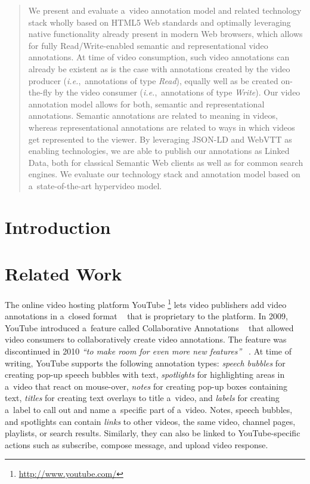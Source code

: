 \documentclass{sig-alternate}
\newcommand{\inlinelistingsize}{\fontsize{8pt}{11pt}}
\let\oldurl\url
\renewcommand{\url}[1]{\inlinelistingsize\oldurl{#1}}
\newcommand{\todo}[1]{\fcolorbox{blue}{white}{\parbox{7cm}{\color{blue}{#1}}}}
\begin{document}
\maketitle
\begin{abstract}
We present and evaluate
a~video annotation model and related technology stack
wholly based on HTML5 Web standards
and optimally leveraging native functionality
already present in modern Web browsers,
which allows for fully Read/Write-enabled
semantic and representational video annotations.
At time of video consumption, such video annotations
can already be existent as is the case
with annotations created by the video producer
(\emph{i.e.},~annotations of type \emph{Read}),
equally well as be created on-the-fly by the video consumer
(\emph{i.e.},~annotations of type \emph{Write}).
Our video annotation model allows for both,
semantic and representational annotations.
Semantic annotations are related to meaning in videos,
whereas representational annotations are related to
ways in which videos get represented to the viewer.
By leveraging JSON-LD and WebVTT as enabling technologies,
we are able to publish our annotations as Linked Data,
both for classical Semantic Web clients
as well as for common search engines.
We evaluate our technology stack and annotation model
based on a~state-of-the-art hypervideo model.
\end{abstract}

\category{ToDo}{\todo{category}}{}

\terms{\todo{terms}}

\keywords{\todo{keywords}}

\section{Introduction}

\section{Related Work}

The online video hosting platform YouTube%
\footnote{\url{http://www.youtube.com/}}
lets video publishers add video annotations
in a~closed format%
~\cite{youtube2008annotations,youtube2010annotations}
that is proprietary to the platform.
In 2009, YouTube introduced a~feature called 
Collaborative Annotations%
~\cite{fink2009collaborativeannotations}
that allowed video consumers to collaboratively
create video annotations.
The feature was discontinued in 2010
\textit{``to make room for even more new features''}%
~\cite{youtube2010annotations}.
At time of writing, YouTube supports the following
annotation types: \emph{speech bubbles} for creating
pop-up speech bubbles with text,
\emph{spotlights} for highlighting areas in a~video
that react on mouse-over,
\emph{notes} for creating pop-up boxes containing text,
\emph{titles} for creating text overlays to title a~video,
and \emph{labels} for creating a~label to call out
and name a~specific part of a~video.
Notes, speech bubbles, and spotlights can contain \emph{links}
to other videos, the same video, channel pages, playlists,
or search results.
Similarly, they can also be linked to YouTube-specific actions
such as subscribe, compose message, and upload video response.
 
\end{document}
